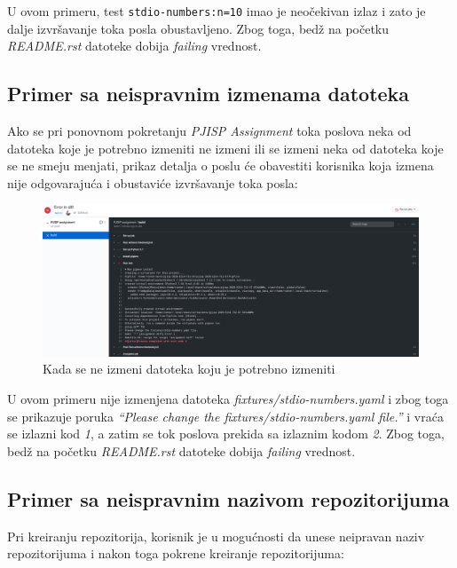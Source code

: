 \documentclass[12pt]{report}
\begin{document}
U ovom primeru, test \texttt{stdio-numbers:n=10} imao je neočekivan izlaz i zato je dalje izvršavanje toka posla obustavljeno. Zbog toga, bedž na početku \textit{README.rst} datoteke dobija \textit{failing} vrednost.

\subsection{Primer sa neispravnim izmenama datoteka}

Ako se pri ponovnom pokretanju \textit{PJISP Assignment} toka poslova neka od datoteka koje je potrebno izmeniti ne izmeni ili se izmeni neka od datoteka koje se ne smeju menjati, prikaz detalja o poslu će obavestiti korisnika koja izmena nije odgovarajuća i obustaviće izvršavanje toka posla:

\begin{figure}[H]
    \centering
    \includegraphics[width=\linewidth]{images/16.png}
    \caption{Kada se ne izmeni datoteka koju je potrebno izmeniti}
\end{figure}

U ovom primeru nije izmenjena datoteka \textit{fixtures/stdio-numbers.yaml} i zbog toga se prikazuje poruka \textit{``Please change the fixtures/stdio-numbers.yaml file.''} i vraća se izlazni kod \textit{1}, a zatim se tok poslova prekida sa izlaznim kodom \textit{2}. Zbog toga, bedž na početku \textit{README.rst} datoteke dobija \textit{failing} vrednost.

\subsection{Primer sa neispravnim nazivom repozitorijuma}

Pri kreiranju repozitorija, korisnik je u mogućnosti da unese neipravan naziv repozitorijuma i nakon toga pokrene kreiranje repozitorijuma:
\end{document}
